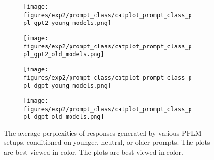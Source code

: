 \begin{figure}[H]
     \centering
     \begin{subfigure}[b]{0.46\textwidth}
        \centering
        \texttt{[image: figures/exp2/prompt\_class/catplot\_prompt\_class\_ppl\_gpt2\_young\_models.png]}
        \caption{}
        \label{subfig:catplot_prompt_class_ppl_gpt2_young}
     \end{subfigure}
     \quad
     \begin{subfigure}[b]{0.46\textwidth}
        \centering
        \texttt{[image: figures/exp2/prompt\_class/catplot\_prompt\_class\_ppl\_gpt2\_old\_models.png]}
        \caption{}
        \label{subfig:catplot_prompt_class_ppl_gpt2_old}
     \end{subfigure}
    \medskip
    \begin{subfigure}[b]{0.46\textwidth}
        \centering
        \texttt{[image: figures/exp2/prompt\_class/catplot\_prompt\_class\_ppl\_dgpt\_young\_models.png]}
        \caption{}
        \label{subfig:catplot_prompt_class_ppl_dgpt_young}
     \end{subfigure}
    \quad
     \begin{subfigure}[b]{0.46\textwidth}
        \centering
        \texttt{[image: figures/exp2/prompt\_class/catplot\_prompt\_class\_ppl\_dgpt\_old\_models.png]}
        \caption{}
        \label{subfig:catplot_prompt_class_ppl_dgpt_old}
     \end{subfigure}
    \caption{The average perplexities of responses generated by various PPLM-setups, conditioned on younger, neutral, or older prompts. The plots are best viewed in color. The plots are best viewed in color.}
    \label{fig:catplot_prompt_class_ppl}
\end{figure}




